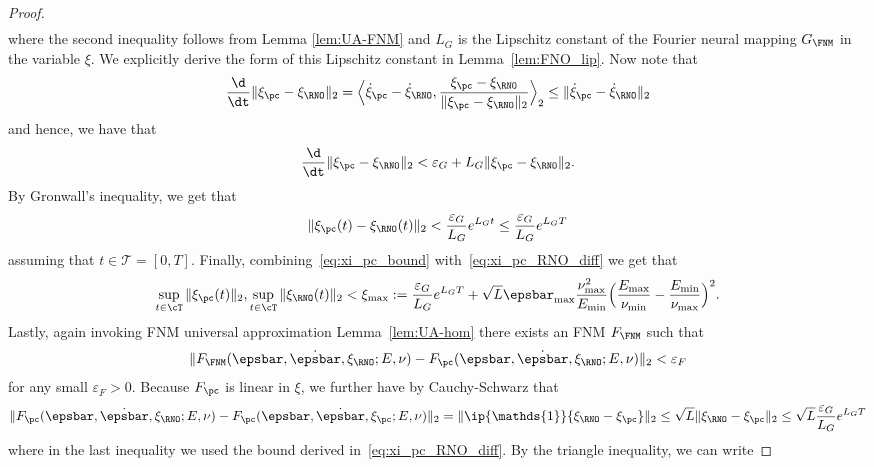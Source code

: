 \documentclass[letterpaper,11pt]{article}
\begin{document}
\begin{proof}
\begin{align*}
    \end{align*}
    where the second inequality follows from Lemma \ref{lem:UA-FNM} and $L_G$ is the Lipschitz constant of the Fourier neural mapping $G_{\FNM}$ in the variable $\xi$. We explicitly derive the form of this Lipschitz constant in Lemma~\ref{lem:FNO_lip}. Now note that
    \begin{equation}
        \frac{\d}{\dt}\|\xi_{\pc} - \xi_{\RNO}\|_2 = \Big\langle\dot{\xi}_{\pc} - \dot{\xi}_{\RNO}, \frac{\xi_{\pc} - \xi_{\RNO}}{\|\xi_{\pc} - \xi_{\RNO}\|_2}\Big\rangle_2 \leq \|\dot{\xi}_{\pc} - \dot{\xi}_{\RNO}\|_2
    \end{equation}
    and hence, we have that
    \begin{align*}
        \frac{\d}{\dt}\|\xi_{\pc} - \xi_{\RNO}\|_2 < \varepsilon_{G} + L_G\|\xi_{\pc} - \xi_{\RNO}\|_2.
    \end{align*}
    By Gronwall's inequality, we get that
    \begin{equation}\label{eq:xi_pc_RNO_diff}
        \|\xi_{\pc}(t) - \xi_{\RNO}(t)\|_2 < \frac{\varepsilon_G}{L_G}e^{L_Gt} \leq \frac{\varepsilon_G}{L_G}e^{L_GT}
    \end{equation}
    assuming that $t \in \mathcal{T} = [0, T]$. Finally, combining~\eqref{eq:xi_pc_bound} with~\eqref{eq:xi_pc_RNO_diff} we get that
    \begin{equation}
        \sup_{t \in \cT}\|\xi_{\pc}(t)\|_2, \sup_{t \in \cT}\|\xi_{\RNO}(t)\|_2 < \xi_{\max} := \frac{\varepsilon_G}{L_G}e^{L_GT} + \sqrt{L}\epsbar_{\max}\frac{\nu_{\max}^2}{E_{\min}}\Big(\frac{E_{\max}}{\nu_{\min}} - \frac{E_{\min}}{\nu_{\max}}\Big)^2.
    \end{equation}
    Lastly, again invoking FNM universal approximation Lemma~\ref{lem:UA-hom} there exists an FNM $F_{\FNM}$ such that 
    \begin{align*}
        \|F_{\FNM}(\epsbar, \dot{\epsbar}, \xi_{\RNO}; E, \nu) - F_{\pc}(\epsbar, \dot{\epsbar}, \xi_{\RNO}; E, \nu)\|_2 < \varepsilon_F
    \end{align*}
    for any small $\varepsilon_F > 0$. Because $F_{\pc}$ is linear in $\xi$, we further have by Cauchy-Schwarz that
    \begin{align*}
        \|F_{\pc}(\epsbar, \dot{\epsbar}, \xi_{\RNO}; E, \nu) - F_{\pc}(\epsbar, \dot{\epsbar}, \xi_{\pc}; E, \nu)\|_2 = \|\ip{\mathds{1}}{\xi_{\RNO} - \xi_{\pc}}\|_2 \leq \sqrt{L}\|\xi_{\RNO} - \xi_{\pc}\|_2 \leq \sqrt{L}\frac{\varepsilon_G}{L_G}e^{L_GT}
    \end{align*}
    where in the last inequality we used the bound derived in~\eqref{eq:xi_pc_RNO_diff}. By the triangle inequality, we can write

\end{proof}
\end{document}
